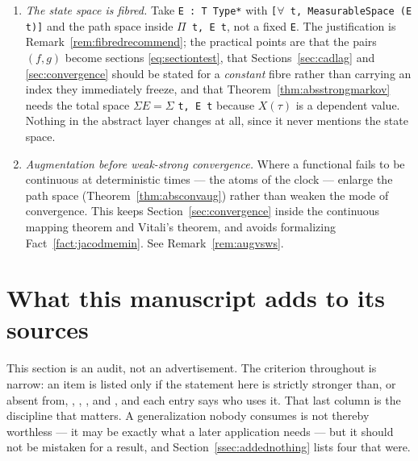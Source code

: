 \documentclass[11pt,a4paper]{article}
\theoremstyle{plain}
\theoremstyle{definition}
\theoremstyle{remark}
\newcommand{\R}{\mathbb{R}}
\newcommand{\DGP}{\cite{DGP24}}
\newcommand{\K}{\mathbb{K}}
\newcommand{\EK}{\cite{EK86}}
\newcommand{\CPS}{\cite{CPS23}}
\newcommand{\KA}{\cite{Kal21}}
\newcommand{\JS}{\cite{JS03}}
\begin{document}
\begin{enumerate}[label=(\alph*)]
  space would do for the \emph{martingales}; formalize the first with
  \texttt{RCLike} and inherit the second.  The places needing $\K = \R$ are
  listed in Remark~\ref{rem:complexvalued}, and the design point is that they are
  \emph{prerequisites}, not statements: the retreat to $\Re$ and $\Im$ happens in
  exactly one lemma, Corollary~\ref{cor:regK}, so in Lean exactly one proof
  destructs the scalar field and everything above it is uniformly
  \texttt{RCLike}.
\item \emph{The state space is fibred.}  Take
  \texttt{E : T \textrightarrow{} Type*} with
  \texttt{[$\forall$ t, MeasurableSpace (E t)]} and the path space inside
  \texttt{$\Pi$ t, E t}, not a fixed \texttt{E}.  The justification is
  Remark~\ref{rem:fibredrecommend}; the practical points are that the pairs
  $(f,g)$ become sections \eqref{eq:sectiontest}, that
  Sections~\ref{sec:cadlag} and \ref{sec:convergence} should be stated for a
  \emph{constant} fibre rather than carrying an index they immediately freeze,
  and that Theorem~\ref{thm:absstrongmarkov} needs the total space
  $\Sigma E = \Sigma$ \texttt{t, E t} because $X(\tau)$ is a dependent value.
  Nothing in the abstract layer changes at all, since it never mentions the state
  space.
\item \emph{Augmentation before weak-strong convergence.}  Where a functional
  fails to be continuous at deterministic times --- the atoms of the clock ---
  enlarge the path space (Theorem~\ref{thm:absconvaug}) rather than weaken the
  mode of convergence.  This keeps Section~\ref{sec:convergence} inside the
  continuous mapping theorem and Vitali's theorem, and avoids formalizing
  Fact~\ref{fact:jacodmemin}.  See Remark~\ref{rem:augvsws}.
\end{enumerate}

\section{What this manuscript adds to its sources}
\label{sec:added}

This section is an audit, not an advertisement.  The criterion throughout is
narrow: an item is listed only if the statement here is strictly stronger than,
or absent from, \EK, \CPS, \JS, \KA{} and \DGP, and each entry says who uses it.
That last column is the discipline that matters.  A generalization nobody
consumes is not thereby worthless --- it may be exactly what a later application
needs --- but it should not be mistaken for a result, and
Section~\ref{ssec:addednothing} lists four that were.
\end{document}

